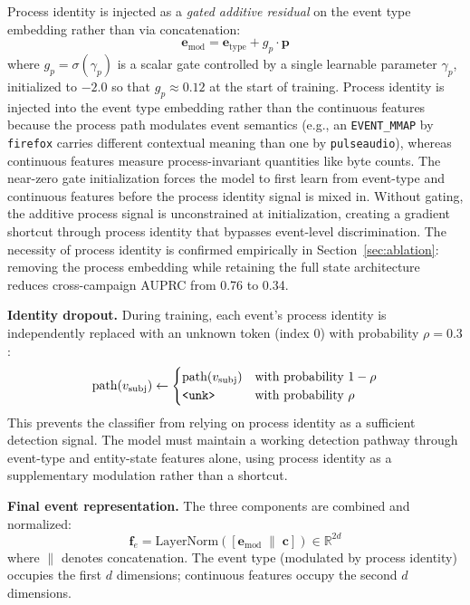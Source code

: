 \documentclass[letterpaper,twocolumn,10pt]{article}
\begin{document}
Process identity is injected as a \emph{gated additive residual} on the event type embedding rather than via concatenation:
\begin{equation}
    \mathbf{e}_{\text{mod}} = \mathbf{e}_{\text{type}} + g_p \cdot \mathbf{p}
    \label{eq:process_gate}
\end{equation}
where $g_p = \sigma(\gamma_p)$ is a scalar gate controlled by a single learnable parameter $\gamma_p$, initialized to $-2.0$ so that $g_p \approx 0.12$ at the start of training. Process identity is injected into the event type embedding rather than the continuous features because the process path modulates event semantics (e.g., an \texttt{EVENT\_MMAP} by \texttt{firefox} carries different contextual meaning than one by \texttt{pulseaudio}), whereas continuous features measure process-invariant quantities like byte counts. The near-zero gate initialization forces the model to first learn from event-type and continuous features before the process identity signal is mixed in. Without gating, the additive process signal is unconstrained at initialization, creating a gradient shortcut through process identity that bypasses event-level discrimination. The necessity of process identity is confirmed empirically in Section~\ref{sec:ablation}: removing the process embedding while retaining the full state architecture reduces cross-campaign AUPRC from 0.76 to 0.34.

\textbf{Identity dropout.} During training, each event's process identity is independently replaced with an unknown token (index 0) with probability $\rho = 0.3$:
\begin{equation}
    \text{path}(v_{\text{subj}}) \leftarrow 
    \begin{cases} 
        \text{path}(v_{\text{subj}}) & \text{with probability } 1 - \rho \\
        \texttt{\textless unk\textgreater} & \text{with probability } \rho
    \end{cases}
\end{equation}
This prevents the classifier from relying on process identity as a sufficient detection signal. The model must maintain a working detection pathway through event-type and entity-state features alone, using process identity as a supplementary modulation rather than a shortcut.

\textbf{Final event representation.} The three components are combined and normalized:
\begin{equation}
    \mathbf{f}_e = \text{LayerNorm}\!\left([\mathbf{e}_{\text{mod}} \;\|\; \mathbf{c}]\right) \in \mathbb{R}^{2d}
    \label{eq:event_repr}
\end{equation}
where $\|$ denotes concatenation. The event type (modulated by process identity) occupies the first $d$ dimensions; continuous features occupy the second $d$ dimensions.
\end{document}
